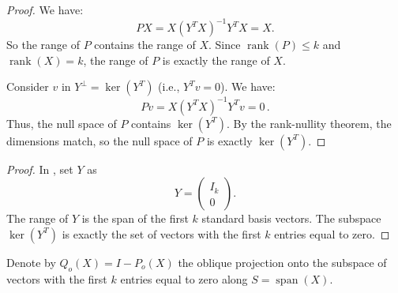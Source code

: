 \documentclass[final]{siamart1116}
\numberwithin{theorem}{section}
\DeclareMathOperator{\rk}{rank}
\DeclareMathOperator{\spn}{span}
\DeclareMathOperator{\range}{range}
\newcommand{\by}{\times}
\begin{document}

\begin{proof}
  We have:
  \[ P X = X {(Y^T X)}^{-1} Y^T X = X. \]
  So the range of $P$ contains the range of $X$. Since $\rk(P) \le k$ and $\rk(X)=k$, the range of $P$ is exactly the range of $X$.

  Consider $v$ in $Y^\perp = \ker(Y^T)$ (i.e., $Y^T v = 0$). We have:
  \[ P v = X {(Y^T X)}^{-1} Y^T v = 0 \,. \]
  Thus, the null space of $P$ contains $\ker(Y^T)$. By the rank-nullity theorem, the dimensions match, so the null space of $P$ is exactly $\ker(Y^T)$.
\end{proof}


\begin{proof}
  In , set $Y$ as
  \[ Y =
    \begin{pmatrix}
      I_k \\ 0
  \end{pmatrix}. \]
  The range of $Y$ is the span of the first $k$ standard basis vectors. The subspace $\ker(Y^T)$ is exactly the set of vectors with the first $k$ entries equal to zero.
\end{proof}

Denote by $Q_o(X) = I - P_o(X)$ the oblique projection onto the subspace of vectors with the first $k$ entries equal to zero along $S=\spn(X)$.
\end{document}
